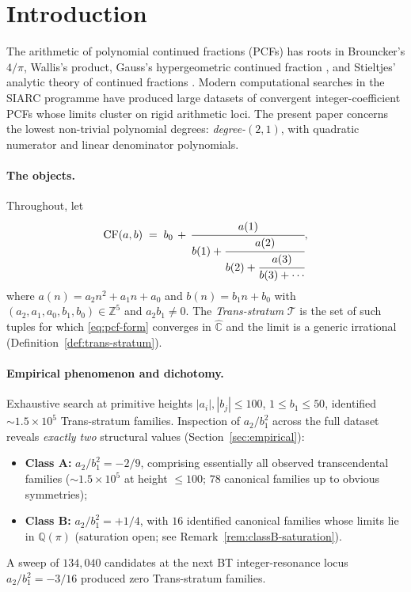 \documentclass[11pt,a4paper]{article}
\theoremstyle{definition}
\begin{document}
\section{Introduction}\label{sec:intro}

The arithmetic of polynomial continued fractions (PCFs) has roots in Brouncker's $4/\pi$, Wallis's product, Gauss's hypergeometric continued fraction \cite{gauss1813}, and Stieltjes' analytic theory of continued fractions \cite{stieltjes1894}. Modern computational searches in the SIARC programme \cite{siarc2024} have produced large datasets of convergent integer-coefficient PCFs whose limits cluster on rigid arithmetic loci. The present paper concerns the lowest non-trivial polynomial degrees: \emph{degree-$(2,1)$}, with quadratic numerator and linear denominator polynomials.

\paragraph{The objects.}
Throughout, let
\begin{equation}\label{eq:pcf-form}
  \mathrm{CF}(a,b) \;=\; b_0 \,+\, \cfrac{a(1)}{b(1) + \cfrac{a(2)}{b(2) + \cfrac{a(3)}{b(3)+\cdots}}},
\end{equation}
where $a(n) = a_2 n^2 + a_1 n + a_0$ and $b(n) = b_1 n + b_0$ with $(a_2, a_1, a_0, b_1, b_0) \in \mathbb{Z}^5$ and $a_2 b_1 \ne 0$. The \emph{Trans-stratum} $\mathcal{T}$ is the set of such tuples for which \eqref{eq:pcf-form} converges in $\widehat{\mathbb{C}}$ and the limit is a generic irrational (Definition~\ref{def:trans-stratum}).

\paragraph{Empirical phenomenon and dichotomy.}
Exhaustive search at primitive heights $|a_i|,|b_j|\le 100$, $1\le b_1 \le 50$, identified $\sim\!1.5\times 10^5$ Trans-stratum families. Inspection of $a_2/b_1^2$ across the full dataset reveals \emph{exactly two} structural values (Section~\ref{sec:empirical}):
\begin{itemize}
  \item \textbf{Class A:} $a_2/b_1^2 = -2/9$, comprising essentially all observed transcendental families ($\sim\!1.5\times 10^5$ at height $\le 100$; $78$ canonical families up to obvious symmetries);
  \item \textbf{Class B:} $a_2/b_1^2 = +1/4$, with $16$ identified canonical families whose limits lie in $\mathbb{Q}(\pi)$ (saturation open; see Remark~\ref{rem:classB-saturation}).
\end{itemize}
A sweep of $134{,}040$ candidates at the next BT integer-resonance locus $a_2/b_1^2 = -3/16$ produced zero Trans-stratum families.
\end{document}
